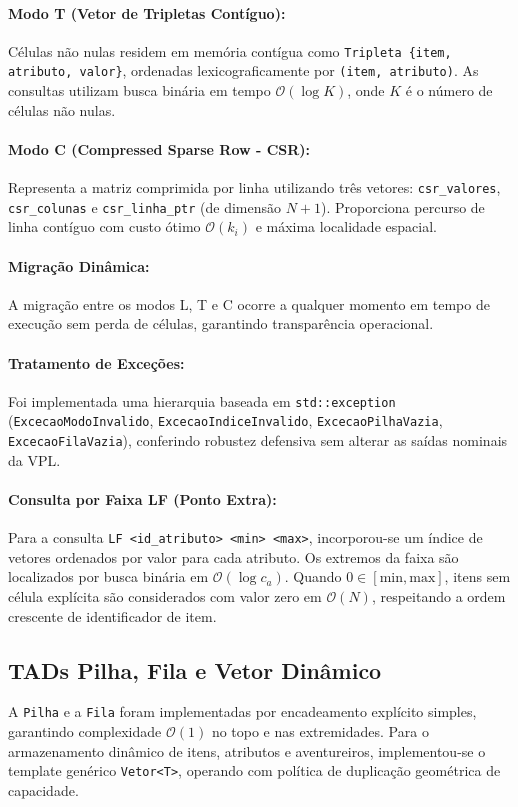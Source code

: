 \documentclass[letterpaper]{article}
\begin{document}
\paragraph{Modo T (Vetor de Tripletas Contíguo):} Células não nulas residem em memória contígua como \texttt{Tripleta \{item, atributo, valor\}}, ordenadas lexicograficamente por \texttt{(item, atributo)}. As consultas utilizam busca binária em tempo $\mathcal{O}(\log K)$, onde $K$ é o número de células não nulas.

\paragraph{Modo C (Compressed Sparse Row - CSR):} Representa a matriz comprimida por linha utilizando três vetores: \texttt{csr\_valores}, \texttt{csr\_colunas} e \texttt{csr\_linha\_ptr} (de dimensão $N+1$). Proporciona percurso de linha contíguo com custo ótimo $\mathcal{O}(k_i)$ e máxima localidade espacial.

\paragraph{Migração Dinâmica:} A migração entre os modos L, T e C ocorre a qualquer momento em tempo de execução sem perda de células, garantindo transparência operacional.

\paragraph{Tratamento de Exceções:} Foi implementada uma hierarquia baseada em \texttt{std::exception} (\texttt{ExcecaoModoInvalido}, \texttt{ExcecaoIndiceInvalido}, \texttt{ExcecaoPilhaVazia}, \texttt{ExcecaoFilaVazia}), conferindo robustez defensiva sem alterar as saídas nominais da VPL.

\paragraph{Consulta por Faixa LF (Ponto Extra):} Para a consulta \texttt{LF <id\_atributo> <min> <max>}, incorporou-se um índice de vetores ordenados por valor para cada atributo. Os extremos da faixa são localizados por busca binária em $\mathcal{O}(\log c_a)$. Quando $0 \in [\text{min}, \text{max}]$, itens sem célula explícita são considerados com valor zero em $\mathcal{O}(N)$, respeitando a ordem crescente de identificador de item.

\subsection{TADs Pilha, Fila e Vetor Dinâmico}
A \texttt{Pilha} e a \texttt{Fila} foram implementadas por encadeamento explícito simples, garantindo complexidade $\mathcal{O}(1)$ no topo e nas extremidades. Para o armazenamento dinâmico de itens, atributos e aventureiros, implementou-se o template genérico \texttt{Vetor<T>}, operando com política de duplicação geométrica de capacidade.
\end{document}
